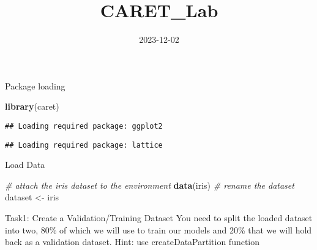\documentclass[
]{article}
\title{CARET\_Lab}
\author{}
\date{\vspace{-2.5em}2023-12-02}
\newenvironment{Shaded}{\begin{snugshade}}{\end{snugshade}}
\newcommand{\AttributeTok}[1]{\textcolor[rgb]{0.13,0.29,0.53}{#1}}
\newcommand{\CommentTok}[1]{\textcolor[rgb]{0.56,0.35,0.01}{\textit{#1}}}
\newcommand{\ConstantTok}[1]{\textcolor[rgb]{0.56,0.35,0.01}{#1}}
\newcommand{\DecValTok}[1]{\textcolor[rgb]{0.00,0.00,0.81}{#1}}
\newcommand{\FloatTok}[1]{\textcolor[rgb]{0.00,0.00,0.81}{#1}}
\newcommand{\FunctionTok}[1]{\textcolor[rgb]{0.13,0.29,0.53}{\textbf{#1}}}
\newcommand{\NormalTok}[1]{#1}
\newcommand{\OtherTok}[1]{\textcolor[rgb]{0.56,0.35,0.01}{#1}}
\newcommand{\SpecialCharTok}[1]{\textcolor[rgb]{0.81,0.36,0.00}{\textbf{#1}}}
\begin{document}
\maketitle

Package loading

\begin{Shaded}
\begin{Highlighting}[]
\FunctionTok{library}\NormalTok{(caret)}
\end{Highlighting}
\end{Shaded}

\begin{verbatim}
## Loading required package: ggplot2
\end{verbatim}

\begin{verbatim}
## Loading required package: lattice
\end{verbatim}

Load Data

\begin{Shaded}
\begin{Highlighting}[]
\CommentTok{\# attach the iris dataset to the environment}
\FunctionTok{data}\NormalTok{(iris)}
\CommentTok{\# rename the dataset}
\NormalTok{dataset }\OtherTok{\textless{}{-}}\NormalTok{ iris}
\end{Highlighting}
\end{Shaded}

Task1: Create a Validation/Training Dataset You need to split the loaded
dataset into two, 80\% of which we will use to train our models and 20\%
that we will hold back as a validation dataset. Hint: use
createDataPartition function

\begin{Shaded}
\end{Shaded}
\end{document}
